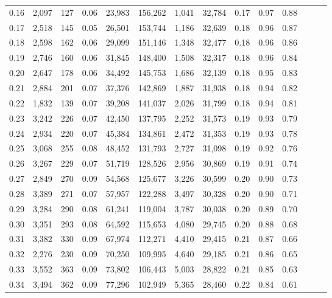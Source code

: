 \begin{tabular}{rrrrrrrrrrrrrr}
0.16 &  2,097 &  127 &  0.06 &   23,983 &  156,262 &   1,041 &  32,784 &  0.17 &  0.97 &      0.88 \\
0.17 &  2,518 &  145 &  0.05 &   26,501 &  153,744 &   1,186 &  32,639 &  0.18 &  0.96 &      0.87 \\
0.18 &  2,598 &  162 &  0.06 &   29,099 &  151,146 &   1,348 &  32,477 &  0.18 &  0.96 &      0.86 \\
0.19 &  2,746 &  160 &  0.06 &   31,845 &  148,400 &   1,508 &  32,317 &  0.18 &  0.96 &      0.84 \\
0.20 &  2,647 &  178 &  0.06 &   34,492 &  145,753 &   1,686 &  32,139 &  0.18 &  0.95 &      0.83 \\
0.21 &  2,884 &  201 &  0.07 &   37,376 &  142,869 &   1,887 &  31,938 &  0.18 &  0.94 &      0.82 \\
0.22 &  1,832 &  139 &  0.07 &   39,208 &  141,037 &   2,026 &  31,799 &  0.18 &  0.94 &      0.81 \\
0.23 &  3,242 &  226 &  0.07 &   42,450 &  137,795 &   2,252 &  31,573 &  0.19 &  0.93 &      0.79 \\
0.24 &  2,934 &  220 &  0.07 &   45,384 &  134,861 &   2,472 &  31,353 &  0.19 &  0.93 &      0.78 \\
0.25 &  3,068 &  255 &  0.08 &   48,452 &  131,793 &   2,727 &  31,098 &  0.19 &  0.92 &      0.76 \\
0.26 &  3,267 &  229 &  0.07 &   51,719 &  128,526 &   2,956 &  30,869 &  0.19 &  0.91 &      0.74 \\
0.27 &  2,849 &  270 &  0.09 &   54,568 &  125,677 &   3,226 &  30,599 &  0.20 &  0.90 &      0.73 \\
0.28 &  3,389 &  271 &  0.07 &   57,957 &  122,288 &   3,497 &  30,328 &  0.20 &  0.90 &      0.71 \\
0.29 &  3,284 &  290 &  0.08 &   61,241 &  119,004 &   3,787 &  30,038 &  0.20 &  0.89 &      0.70 \\
0.30 &  3,351 &  293 &  0.08 &   64,592 &  115,653 &   4,080 &  29,745 &  0.20 &  0.88 &      0.68 \\
0.31 &  3,382 &  330 &  0.09 &   67,974 &  112,271 &   4,410 &  29,415 &  0.21 &  0.87 &      0.66 \\
0.32 &  2,276 &  230 &  0.09 &   70,250 &  109,995 &   4,640 &  29,185 &  0.21 &  0.86 &      0.65 \\
0.33 &  3,552 &  363 &  0.09 &   73,802 &  106,443 &   5,003 &  28,822 &  0.21 &  0.85 &      0.63 \\
0.34 &  3,494 &  362 &  0.09 &   77,296 &  102,949 &   5,365 &  28,460 &  0.22 &  0.84 &      0.61 \\

\end{tabular}
